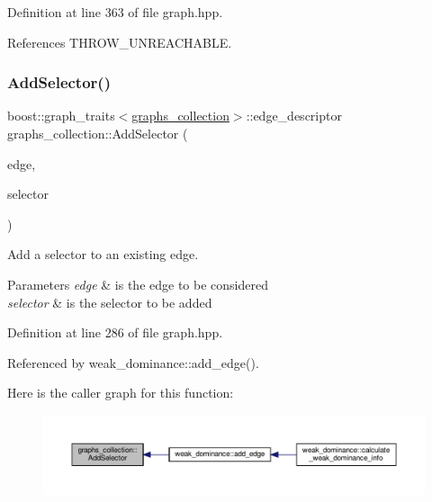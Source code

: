 Definition at line 363 of file graph.\+hpp.



References T\+H\+R\+O\+W\+\_\+\+U\+N\+R\+E\+A\+C\+H\+A\+B\+LE.

\mbox{\label{structgraphs__collection_adcd8cfbff5b78d0b5efa7c50e0226bb4}} 
\subsubsection{\texorpdfstring{Add\+Selector()}{AddSelector()}\hspace{0.1cm}{\footnotesize\ttfamily [1/2]}}
{\footnotesize\ttfamily boost\+::graph\+\_\+traits$<$\hyperlink{structgraphs__collection}{graphs\+\_\+collection}$>$\+::edge\+\_\+descriptor graphs\+\_\+collection\+::\+Add\+Selector (\begin{DoxyParamCaption}\item[{const boost\+::graph\+\_\+traits$<$ \hyperlink{structgraphs__collection}{graphs\+\_\+collection} $>$\+::edge\+\_\+descriptor}]{edge,  }\item[{const int}]{selector }\end{DoxyParamCaption})\hspace{0.3cm}{\ttfamily [inline]}}



Add a selector to an existing edge. 


\begin{DoxyParams}{Parameters}
{\em edge} & is the edge to be considered \\
\hline
{\em selector} & is the selector to be added \\
\hline
\end{DoxyParams}


Definition at line 286 of file graph.\+hpp.



Referenced by weak\+\_\+dominance\+::add\+\_\+edge().

Here is the caller graph for this function\+:
\nopagebreak
\begin{figure}[H]
\begin{center}
\leavevmode
\includegraphics[width=350pt]{d8/d8d/structgraphs__collection_adcd8cfbff5b78d0b5efa7c50e0226bb4_icgraph}
\end{center}
\end{figure}
\mbox{\label{structgraphs__collection_aad4e620510dc2da5a835d49149701fe4}} 
